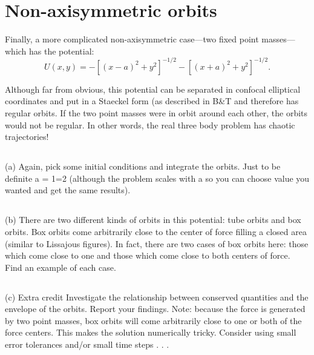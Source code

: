 \section{Non-axisymmetric orbits}

Finally, a more complicated non-axisymmetric case—two fixed point
masses—which has the potential:
\begin{equation}
    U(x,y) = -[(x-a)^2 +y^2]^{-1/2} -[(x+a)^2 +y^2]^{-1/2}.
\end{equation}

Although far from obvious, this potential can be separated in confocal
elliptical coordinates and put in a Staeckel form (as described in B\&T
and therefore has regular orbits. If the two point masses were in orbit
around each other, the orbits would not be regular. In other words, the
real three body problem has chaotic trajectories!
\subsection{}
(a) Again, pick some initial conditions and integrate the orbits. Just
to be definite a = 1=2 (although the problem scales with a so you
can choose value you wanted and get the same results).
\subsection{}
(b) There are two different kinds of orbits in this potential: tube orbits
and box orbits. Box orbits come arbitrarily close to the center of
force filling a closed area (similar to Lissajous figures). In fact,
there are two cases of box orbits here: those which come close to
one and those which come close to both centers of force. Find an
example of each case.
\subsection{}
(c) Extra credit Investigate the relationship between conserved quantities and the envelope of the orbits. Report your findings.
Note: because the force is generated by two point masses, box orbits
will come arbitrarily close to one or both of the force centers. This
makes the solution numerically tricky. Consider using small error tolerances and/or small time steps . . .